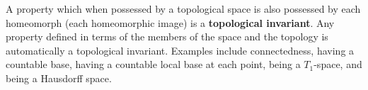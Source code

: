 A property which when possessed by a topological space is also possessed by each homeomorph (each homeomorphic image) is a \textbf{topological invariant}. Any property defined in terms of the members of the space and the topology is automatically a topological invariant. Examples include connectedness, having a countable base, having a countable local base at each point, being a $T_1$-space, and being a Hausdorff space.
